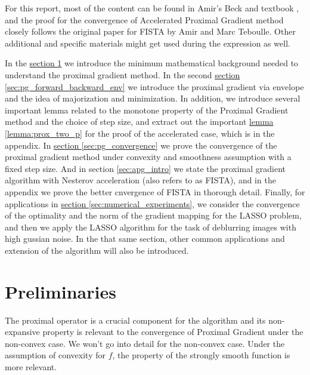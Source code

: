 \documentclass[]{article}
\theoremstyle{definition}
\begin{document}
    \par
    For this report, most of the content can be found in Amir's Beck and textbook \cite{book:first_order_opt}, and the proof for the convergence of Accelerated Proximal Gradient method closely follows the original paper for FISTA\cite{paper:FISTA} by Amir and Marc Teboulle. Other additional and specific materials might get used during the expression as well. 
    \par 
    In the \hyperref[sec:preliminaries]{section \ref*{sec:preliminaries}} we introduce the minimum mathematical background needed to understand the proximal gradient method. In the second \hyperref[sec:pg_forward_backward_env]{section \ref*{sec:pg_forward_backward_env}} we introduce the proximal gradient via envelope and the idea of majorization and minimization. In addition, we introduce several important lemma related to the monotone property of the Proximal Gradient method and the choice of step size, and extract out the important \hyperref[lemma:prox_two_p]{lemma \ref*{lemma:prox_two_p}} for the proof of the accelerated case, which is in the appendix. In \hyperref[sec:pg_convergence]{section \ref*{sec:pg_convergence}} we prove the convergence of the proximal gradient method under convexity and smoothness assumption with a fixed step size. And in section \ref*{sec:apg_intro} we state the proximal gradient algorithm with Nesterov acceleration (also refers to as FISTA), and in the appendix we prove the better cnvergence of FISTA in thorough detail. Finally, for applications in \hyperref[sec:numerical_experiments]{section \ref*{sec:numerical_experiments}}, we consider the convergence of the optimality and the norm of the gradient mapping for the LASSO problem, and then we apply the LASSO algorithm for the task of deblurring images with high gussian noise. In the that same section, other common applications and extension of the algorithm will also be introduced. 

\section{Preliminaries}\label{sec:preliminaries}
    The proximal operator is a crucial component for the algorithm and its non-expansive  property is relevant to the convergence of Proximal Gradient under the non-convex case. We won't go into detail for the non-convex case. Under the assumption of convexity for $f$, the property of the strongly smooth function is more relevant. 
\end{document}
